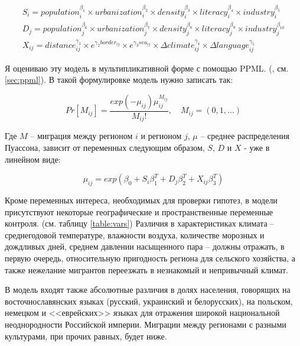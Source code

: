 \documentclass[a4paper,12pt]{article}
\begin{document}
\begin{gather*}\label{eq:sdx}
	S_{i} = 
		\mathit{population}^{\beta_1}_{i} \times 
		\mathit{urbanization}^{\beta_2}_{i} \times 
		\mathit{density}^{\beta_3}_{i} \times 
		\mathit{literacy}^{\beta_4}_{i} \times 
		\mathit{industry}^{\beta_5}_{i} \\
	D_{j} = 
		\mathit{population}^{\beta_6}_{j} \times 
		\mathit{urbanization}^{\beta_7}_{j} \times 
		\mathit{density}^{\beta_8}_{j} \times 
		\mathit{literacy}^{\beta_9}_{j} \times 
		\mathit{industry}^{\beta_{10}}_{j} \\
	X_{ij} = 
		\mathit{distance}^{\gamma_1}_{ij} \times 
		e^{{\gamma_2} \mathit{border}_{ij}} \times 
		e^{{\gamma_3} \mathit{sea}_{ij}} \times 
		\Delta\mathit{climate}^{\gamma_4}_{ij} \times 
		\Delta\mathit{language}^{\gamma_5}_{ij} %
\end{gather*}

Я оцениваю эту модель в мультипликативной форме с помощью PPML. (\cite{silva_log_2006}, см. \ref{sec:ppml}). В такой формулировке модель нужно записать так:

\begin{equation}\label{eq:poisson}
	Pr[M_{ij}] = \frac{exp(-\mu_{ij})\mu^{M_{ij}}_{ij}}{M_{ij}!},\quad M_{ij} = (0, 1, ...)
\end{equation}

Где $M$ – миграция между регионом $i$ и регионом $j$, $\mu$ – среднее распределения Пуассона, зависит от переменных следующим образом, $S$, $D$ и $X$ - уже в линейном виде:

\begin{equation}\label{eq:mu}
	\mu_{ij} = exp(\beta_0 + S_i \beta_1^T + D_{j} \beta_2^T + X_{ij} \beta_3^T)
\end{equation}

Кроме переменных интереса, необходимых для проверки гипотез, в модели присутствуют некоторые географические и пространственные переменные контроля. (см. таблицу \ref{table:vars}) Различия в характеристиках климата – среднегодовой температуре, влажности воздуха, количестве морозных и дождливых дней, среднем давлении насыщенного пара – должны отражать, в первую очередь, относительную пригодность региона для сельского хозяйства, а также нежелание мигрантов переезжать в незнакомый и непривычный климат. 

В модель входят также абсолютные различия в долях населения, говорящих на восточнославянских языках (русский, украинский и белорусских), на польском, немецком и <<еврейских>> языках для отражения широкой национальной неоднородности Российской империи. Миграции между регионами с разными культурами, при прочих равных, будет ниже. 
\end{document}
